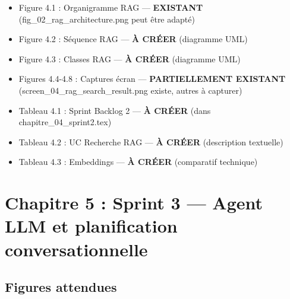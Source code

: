 \documentclass[12pt,a4paper]{article}
\begin{document}
\begin{itemize}
    \item[\textcolor{green}{\checkmark}] Figure 4.1 : Organigramme RAG — \textbf{EXISTANT} (fig\_02\_rag\_architecture.png peut être adapté)
    \item[\textcolor{green}{\checkmark}] Figure 4.2 : Séquence RAG — \textbf{À CRÉER} (diagramme UML)
    \item[\textcolor{green}{\checkmark}] Figure 4.3 : Classes RAG — \textbf{À CRÉER} (diagramme UML)
    \item[\textcolor{orange}{!}] Figures 4.4-4.8 : Captures écran — \textbf{PARTIELLEMENT EXISTANT} (screen\_04\_rag\_search\_result.png existe, autres à capturer)
    
    \item[\textcolor{green}{\checkmark}] Tableau 4.1 : Sprint Backlog 2 — \textbf{À CRÉER} (dans chapitre\_04\_sprint2.tex)
    \item[\textcolor{green}{\checkmark}] Tableau 4.2 : UC Recherche RAG — \textbf{À CRÉER} (description textuelle)
    \item[\textcolor{green}{\checkmark}] Tableau 4.3 : Embeddings — \textbf{À CRÉER} (comparatif technique)
\end{itemize}


\section{Chapitre 5 : Sprint 3 — Agent LLM et planification conversationnelle}

\subsection*{Figures attendues}
\end{document}

